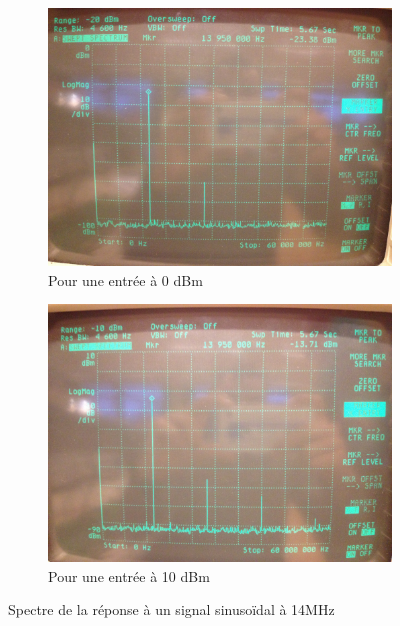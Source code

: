 \documentclass{article}
\begin{document}
\begin{figure}[h]
	\centering
	\begin{subfigure}[b]{0.43\textwidth}
		\centering
		\includegraphics[width=\textwidth]{6_3_2_2MHz_0dbm}
		\caption{Pour une entrée à 0 dBm}
		\label{fig:6_0dbm}
	\end{subfigure}
	\hfill
	\begin{subfigure}[b]{0.43\textwidth}
		\centering
		\includegraphics[width=\textwidth]{6_3_2_2MHz_10dbm}
		\caption{Pour une entrée à 10 dBm}
		\label{fig:6_10dbm}
	\end{subfigure}
	\caption{Spectre de la réponse à un signal sinusoïdal à 14MHz}
\end{figure}
\end{document}

